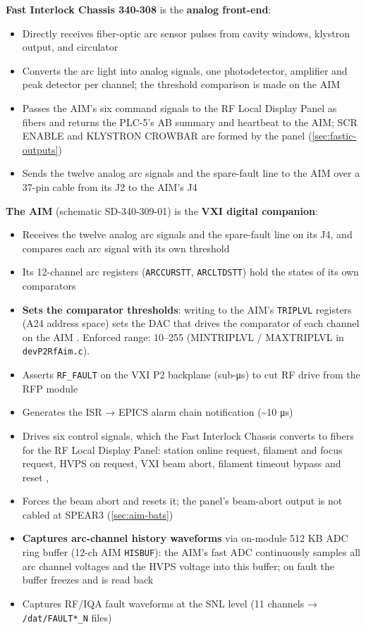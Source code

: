 \textbf{Fast Interlock Chassis 340-308} is the \textbf{analog front-end}:

\begin{itemize}
\tightlist
\item
  Directly receives fiber-optic arc sensor pulses from cavity windows, klystron output, and circulator
\item
  Converts the arc light into analog signals, one photodetector, amplifier and peak detector per channel; the threshold comparison is made on the AIM
\item
  Passes the AIM's six command signals to the RF Local Display Panel as fibers and returns the PLC-5's AB summary and heartbeat to the AIM; SCR ENABLE and KLYSTRON CROWBAR are formed by the panel (\cref{sec:fastic-outputs})
\item
  Sends the twelve analog arc signals and the spare-fault line to the AIM over a 37-pin cable from its J2 to the AIM's J4 
\end{itemize}

\textbf{The AIM} (schematic SD-340-309-01) is the \textbf{VXI digital companion}:

\begin{itemize}
\tightlist
\item
  Receives the twelve analog arc signals and the spare-fault line on its J4, and compares each arc signal with its own threshold 
\item
  Its 12-channel arc registers (\texttt{ARCCURSTT}, \texttt{ARCLTDSTT}) hold the states of its own comparators
\item
  \textbf{Sets the comparator thresholds}: writing to the AIM's \texttt{TRIPLVL} registers (A24 address space) sets the DAC that drives the comparator of each channel on the AIM . Enforced range: 10--255 (MINTRIPLVL / MAXTRIPLVL in \texttt{devP2RfAim.c}).
\item
  Asserts \texttt{RF\_FAULT} on the VXI P2 backplane (sub-μs) to cut RF drive from the RFP module
\item
  Generates the ISR → EPICS alarm chain notification (\textasciitilde10 μs)
\item
  Drives six control signals, which the Fast Interlock Chassis converts to fibers for the RF Local Display Panel: station online request, filament and focus request, HVPS on request, VXI beam abort, filament timeout bypass and reset , 
\item
  Forces the beam abort and resets it; the panel's beam-abort output is not cabled at SPEAR3 (\cref{sec:aim-bats})
\item
  \textbf{Captures arc-channel history waveforms} via on-module 512 KB ADC ring buffer (12-ch AIM \texttt{HISBUF}): the AIM's fast ADC continuously samples all arc channel voltages and the HVPS voltage into this buffer; on fault the buffer freezes and is read back
\item
  Captures RF/IQA fault waveforms at the SNL level (11 channels → \texttt{/dat/FAULT*\_N} files)
\end{itemize}

